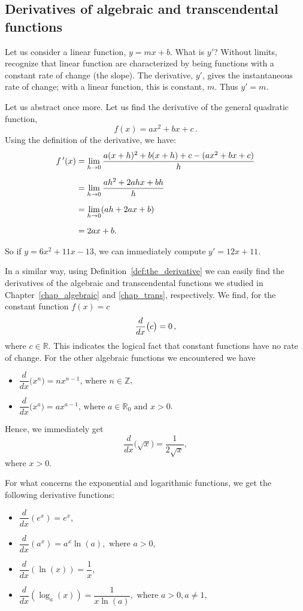 \subsection{Derivatives of algebraic and transcendental functions}
Let us consider a linear function, $y=mx+b$. What is $y'$? Without limits, recognize that linear function are characterized by being functions with a constant rate of change (the slope). The derivative, $y'$, gives the instantaneous rate of change; with a linear function, this is constant, $m$. Thus $y'=m$. 

Let us abstract once more. Let us find the derivative of the general quadratic function, $$f(x) = ax^2+bx+c\,.$$ Using the definition of the derivative, we have:
		\begin{align*}
		f\,'(x) 	&=	\lim_{h\to 0}\frac{a(x+h)^2+b(x+h)+c-(ax^2+bx+c)}{h} \\[0.2cm]
						&=	\lim_{h\to 0} \frac{ah^2+2ahx+bh}{h} \\[0.2cm]
						&=	\lim_{h\to 0}(ah+2ax+b)\\[0.2cm]
						&= 2ax+b.
		\end{align*}
		
So if $y = 6x^2+11x-13$, we can immediately compute $y' = 12x+11$. 

In a similar way, using Definition~\ref{def:the_derivative} we can easily find the derivatives of the algebraic and transcendental functions we studied in Chapter~\ref{chap_algebraic} and \ref{chap_trans}, respectively. We find, for the constant function $f(x)=c$
$$
\displaystyle \frac{d}{dx}\big( c\big) = 0\,,
$$
where $c\in\mathbb{R}$. This indicates the logical fact that constant functions have no rate of change. For the other algebraic functions we encountered we have 
\begin{itemize}
\item $\dfrac{d}{dx}\big(x^n\big) = nx^{n-1}\mbox{, where } n\in \mathbb{Z}$,
\item $\dfrac{d}{dx}\big(x^a\big) = ax^{a-1}\mbox{, where } a\in \mathbb{R}_0\mbox{ and } x>0$.
\end{itemize}
Hence, we immediately get 
$$
\dfrac{d}{dx}\big(\sqrt{x}\big) = \dfrac{1}{2\sqrt{x}},
$$
where $x>0$.

For what concerns the exponential and logarithmic functions, we get the following derivative functions:
\begin{multicols}{2}
\begin{itemize}
\item	$\dfrac{d}{dx}\left(e^x\right) = e^x$,	
\item	$\dfrac{d}{dx}\left(a^x\right) = a^x \ln(a), \text{ where } a>0 $,	
\item	$\dfrac{d}{dx}\left(\ln (x)\right) = \dfrac{1}{x}$,
\item	$\dfrac{d}{dx}\left(\log_a (x)\right) = \dfrac{1}{x \ln (a)}, \text{ where } a>0,  a \neq 1$,
\end{itemize}
\end{multicols}

